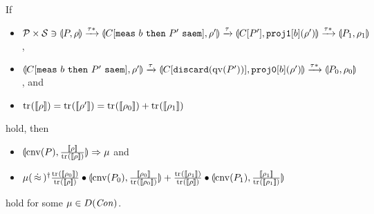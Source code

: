 \begin{lem}
\label{symqccs:prfofweakmeas}
If
\begin{itemize}
 \item  $\mathcal{P} \times \mathcal{S} \ni
	\llparenthesis P, \rho \rrparenthesis \xrightarrow{\tau\ast}
	\llparenthesis C[{\tt meas}~b~{\tt then}~P'~{\tt saem}], \rho' \rrparenthesis 
	\xrightarrow{\tau}
	\llparenthesis C[P'], \mathtt{proj1}[b](\rho') \rrparenthesis 
	\xrightarrow{\tau\ast} \llparenthesis P_1, \rho_1 \rrparenthesis$,
 \item  $\llparenthesis C[{\tt meas}~b~{\tt then}~P'~{\tt saem}], \rho' \rrparenthesis \xrightarrow{\tau}
	\llparenthesis C[\mathtt{discard}(\mathrm{qv}(P'))], \mathtt{proj0}[b](\rho') \rrparenthesis
	\xrightarrow{\tau\ast}\llparenthesis P_0, \rho_0 \rrparenthesis$, and
 \item  $\tr{}{\braw{\rho}} = \tr{}{\braw{\rho'}} = 
	\tr{}{\braw{\rho_0}} + \tr{}{\braw{\rho_1}}$
\end{itemize}
hold, then
\begin{itemize}
 \item $\llparenthesis \mathrm{cnv}(P), \frac{[\![\rho]\!]}{{\rm tr}_{}([\![\rho]\!])} \rrparenthesis
       \Rightarrow \mu$ and
 \item $\mu (\strg)^\dagger
       \frac{\tr{}{\braw{\rho_0}}}{\tr{}{\braw{\rho}}} \bullet 
       \con{\cnv{P_0}}{\frac{\braw{\rho_0}}{\tr{}{\braw{\rho_0}}}}
       +\frac{\tr{}{\braw{\rho_1}}}{\tr{}{\braw{\rho}}} \bullet
       \con{\cnv{P_1}}{\frac{\braw{\rho_1}}{\tr{}{\braw{\rho_1}}}}$
\end{itemize}
hold for some $\mu \in D(\mathit{Con})$.
\end{lem}
